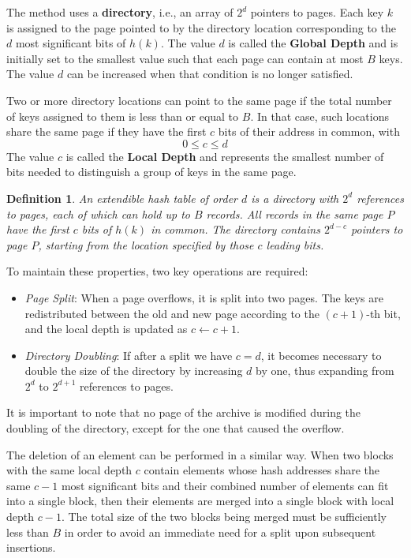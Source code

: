 \documentclass{report}
\newtheorem{defin}{Definition}[chapter]
\begin{document}
The method uses a \textbf{{directory}}, i.e., an array of $2^d$ pointers to pages. Each key $k$ is assigned to the page pointed to by the directory location corresponding to the $d$ most significant bits of $h(k)$. The value $d$ is called the \textbf{{Global Depth}} and is initially set to the smallest value such that each page can contain at most $B$ keys. The value $d$ can be increased when that condition is no longer satisfied.

Two or more directory locations can point to the same page if the total number of keys assigned to them is less than or equal to $B$. In that case, such locations share the same page if they have the first $c$ bits of their address in common, with
\begin{equation}
0 \leq c \leq d
\end{equation}
The value $c$ is called the \textbf{Local Depth} and represents the smallest number of bits needed to distinguish a group of keys in the same page.

\begin{defin}
An \textit{extendible hash table} of order $d$ is a directory with $2^d$ references to pages, each of which can hold up to $B$ records. All records in the same page $P$ have the first $c$ bits of $h(k)$ in common. The directory contains $2^{d - c}$ pointers to page $P$, starting from the location specified by those $c$ leading bits.
\end{defin}
\noindent To maintain these properties, two key operations are required:
\begin{itemize}
  \item \textit{Page Split}: When a page overflows, it is split into two pages. The keys are redistributed between the old and new page according to the $(c+1)$-th bit, and the local depth is updated as $c \leftarrow c + 1$.
  \item \textit{Directory Doubling}: If after a split we have $c = d$, it becomes necessary to double the size of the directory by increasing $d$ by one, thus expanding from $2^d$ to $2^{d+1}$ references to pages.
\end{itemize}
It is important to note that no page of the archive is modified during the doubling of the directory, except for the one that caused the overflow.

The deletion of an element can be performed in a similar way. When two blocks with the same local depth $c$ contain elements whose hash addresses share the same $c - 1$ most significant bits and their combined number of elements can fit into a single block, then their elements are merged into a single block with local depth $c - 1$. The total size of the two blocks being merged must be sufficiently less than $B$ in order to avoid an immediate need for a split upon subsequent insertions.
\end{document}
